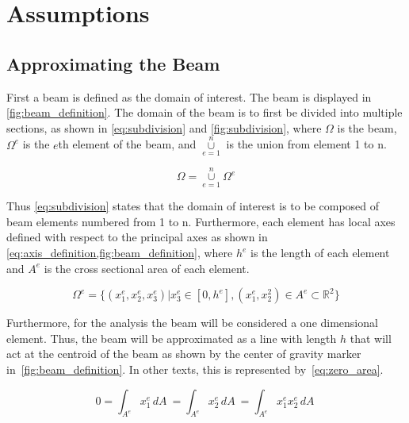 \section{Assumptions}
\label{sec:assumptions}


\subsection{Approximating the Beam}
First a beam is defined as the domain of interest.
The beam is displayed in \cref{fig:beam_definition}.
The domain of the beam is to first be divided into multiple sections, as shown in \cref{eq:subdivision} and \cref{fig:subdivision}, where 
$\Omega$ is the beam,
$\Omega^e$  is the $e$th element of the beam, and
$\overset{n}{\underset{e=1}{\cup}}$ is the union from element 1 to n.

\begin{equation}
 \Omega = \overset{n}{\underset{e=1}{\cup}} \Omega^e
 \label{eq:subdivision}
 \end{equation}

Thus \cref{eq:subdivision} states that the domain of interest is to be composed of beam elements numbered from 1 to n.
Furthermore, each element has local axes defined with respect to the principal axes as shown in \cref{eq:axis_definition,fig:beam_definition}, where $h^e$ is the length of each element and $A^e$ is the cross sectional area of each element.

\begin{equation}
\Omega^e = \{
(x_1^e, x_2^e, x_3^e)
|x_3^e 
\in 
[0,h^e], 
(x_1^e, x_2^2) 
\in
A^e 
\subset
\mathbb{R}^2 
\}
\label{eq:axis_definition}
\end{equation}

Furthermore, for the analysis the beam will be considered a one dimensional element. 
Thus, the beam will be approximated as a line with length $h$ that will act at the centroid of the beam as shown by the center of gravity marker in~\cref{fig:beam_definition}.
In other texts, this is represented by~\cref{eq:zero_area}.

\begin{equation}
0 =
\int_{A^e} x_1^e \,dA \  =
\int_{A^e} x_2^e \,dA \ =
\int_{A^e} x_1^e x_2^e \,dA \
\label{eq:zero_area}
\end{equation}




